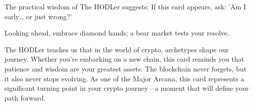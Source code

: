 \documentclass[11pt,oneside]{article}
\begin{document}
The practical wisdom of The HODLer suggests: If this card appears, ask: 'Am I early… or just wrong?' 

Looking ahead, embrace diamond hands; a bear market tests your resolve. 

The HODLer teaches us that in the world of crypto, archetypes shape our journey. Whether you're embarking on a new chain, this card reminds you that patience and wisdom are your greatest assets. The blockchain never forgets, but it also never stops evolving. As one of the Major Arcana, this card represents a significant turning point in your crypto journey—a moment that will define your path forward.
\end{document}
